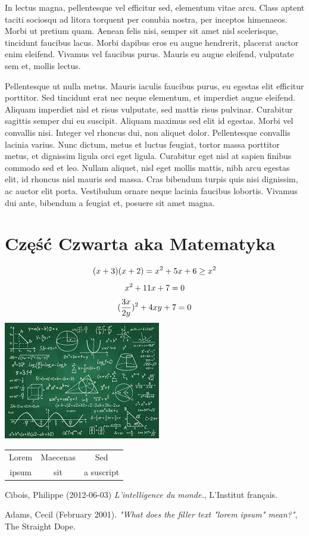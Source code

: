 \documentclass[]{article}
\begin{document}
In lectus magna, pellentesque vel efficitur sed, elementum vitae arcu. Class aptent taciti sociosqu ad litora torquent per conubia nostra, per inceptos himenaeos. Morbi ut pretium quam. Aenean felis nisi, semper sit amet nisl scelerisque, tincidunt faucibus lacus. Morbi dapibus eros eu augue hendrerit, placerat auctor enim eleifend. Vivamus vel faucibus purus. Mauris eu augue eleifend, vulputate sem et, mollis lectus.

Pellentesque ut nulla metus. Mauris iaculis faucibus purus, eu egestas elit efficitur porttitor. Sed tincidunt erat nec neque elementum, et imperdiet augue eleifend. Aliquam imperdiet nisl et risus vulputate, sed mattis risus pulvinar. Curabitur sagittis semper dui eu suscipit. Aliquam maximus sed elit id egestas. Morbi vel convallis nisi. Integer vel rhoncus dui, non aliquet dolor. Pellentesque convallis lacinia varius. Nunc dictum, metus et luctus feugiat, tortor massa porttitor metus, et dignissim ligula orci eget ligula. Curabitur eget nisl at sapien finibus commodo sed et leo. Nullam aliquet, nisl eget mollis mattis, nibh arcu egestas elit, id rhoncus nisl mauris sed massa. Cras bibendum turpis quis nisi dignissim, ac auctor elit porta. Vestibulum ornare neque lacinia faucibus lobortis. Vivamus dui ante, bibendum a feugiat et, posuere sit amet magna.
\newpage
\section{Część Czwarta aka Matematyka}
\begin{equation}
(x+3)(x+2)=x^2+5x+6\notag\\
\geq x^2
\end{equation}
\begin{equation}
x^2+11x+7=0\notag
\end{equation}
\begin{equation}
(\frac{3x}{2y})^2 + 4xy + 7 = 0\notag
\end{equation}
\includegraphics[scale=0.25]{math}
\begin{center}
\begin{tabular}{ | c | c | c | }
  \hline
  Lorem & Maecenas & Sed \\
  ipsum & sit &  a suscript \\
  \hline
\end{tabular}
\end{center}
\newpage
\begin{thebibliography}{2}
Cibois, Philippe (2012-06-03) \emph{ L'intelligence du monde.}, L'Institut français.

Adams, Cecil (February 2001). \emph{ "What does the filler text "lorem ipsum" mean?"}, The Straight Dope.
\end{thebibliography}
\end{document}
